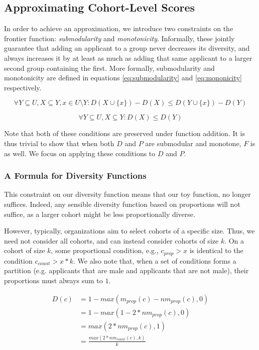 \subsection{Approximating Cohort-Level Scores}

In order to achieve an approximation, we introduce two constraints on the frontier function: \textit{submodularity} and \textit{monotonicity}. Informally, these jointly guarantee that adding an applicant to a group never decreases its diversity, and always increases it by at least as much as adding that same applicant to a larger second group containing the first. More formally, submodularity and monotonicity are defined in equations \ref{eq:submodularity} and \ref{eq:mononicity} respectively.

\begin{equation}
    \label{eq:submodularity}
    \forall Y \subseteq U, X \subseteq Y, x \in U \setminus Y: D(X \cup \{x\}) - D(X) \leq D(Y \cup \{x\}) - D(Y)
\end{equation}

\begin{equation}
    \label{eq:mononicity}
    \forall Y \subseteq U, X \subseteq Y: D(X)\leq D(Y)
\end{equation}

Note that both of these conditions are preserved under function addition. It is thus trivial to show that when both $D$ and $P$ are submodular and monotone, $F$ is as well. We focus on applying these conditions to $D$ and $P$.

\subsubsection{A Formula for Diversity Functions}
This constraint on our diversity function means that our toy function, no longer suffices. Indeed, any sensible diversity function based on proportions will not suffice, as a larger cohort might be less proportionally diverse.

However, typically, organizations aim to select cohorts of a specific size. Thus, we need not consider all cohorts, and can instead consider cohorts of size $k$. On a cohort of size $k$, some proportional condition, e.g., $c_{prop} > x$ is identical to the condition $c_{count} > x*k$. We also note that, when a set of conditions forms a partition (e.g. applicants that are male and applicants that are not male), their proportions must always sum to $1$.

\begin{equation}
    \label{eq:prop}
    \begin{split}
        D(c) &= 1 - max(m_{prop}(c) - nm_{prop}(c), 0) \\
        &= 1 - max(1 - 2*nm_{prop}(c), 0) \\
        &= max(2*nm_{prop}(c), 1) \\
        &= \frac{max(2*nm_{count}(c), k)}{k}
    \end{split}
\end{equation}

